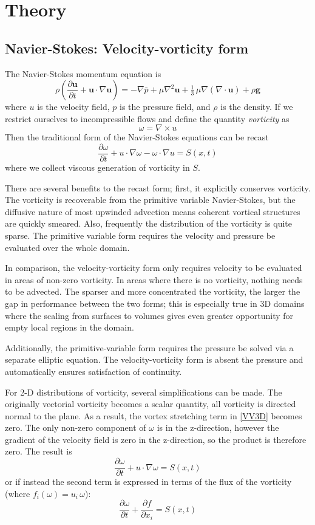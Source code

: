 \documentclass[letterpaper,12pt]{report}
\newcommand{\be}{\begin{equation}}
\newcommand{\ben}[1]{\begin{equation}\label{#1}}
\newcommand{\ee}{\end{equation}}
\begin{document}
\chapter{Theory}
\section{Navier-Stokes: Velocity-vorticity form}
The Navier-Stokes momentum equation is
 \be \rho \left(\frac{\partial \mathbf{u}}{\partial t} + \mathbf{u} \cdot \nabla \mathbf{u} \right) = -\nabla \bar{p} + \mu \nabla^2 \mathbf u + \tfrac13 \, \mu \nabla (\nabla\cdot\mathbf{u}) + \rho \mathbf{g}  \ee
where $u$ is the velocity field, $p$ is the pressure field, and $\rho$ is the density. If we restrict ourselves to incompressible flows and define the quantity \textit{vorticity} as
\be \omega = \nabla \times u \ee
Then the traditional form of the Navier-Stokes equations can be recast
\ben{VV3D} \frac{\partial \omega}{\partial t} + u \cdot \nabla \omega - \omega \cdot \nabla u = S(x,t)\ee
where we collect viscous generation of vorticity in $S$.

There are several benefits to the recast form; first, it explicitly conserves vorticity. The vorticity is recoverable from the primitive variable Navier-Stokes, but the diffusive nature of most upwinded advection means coherent vortical structures are quickly smeared. Also, frequently the distribution of the vorticity is quite sparse. The primitive variable form requires the velocity and pressure be evaluated over the whole domain.

In comparison, the velocity-vorticity form only requires velocity to be evaluated in areas of non-zero vorticity. In areas where there is no vorticity, nothing needs to be advected. The sparser and more concentrated the vorticity, the larger the gap in performance between the two forms; this is especially true in 3D domains where the scaling from surfaces to volumes gives even greater opportunity for empty local regions in the domain. 

Additionally, the primitive-variable form requires the pressure be  solved via a separate elliptic equation. The velocity-vorticity form is absent the pressure and automatically ensures satisfaction of continuity.

For 2-D distributions of vorticity, several simplifications can be made. The originally vectorial vorticity becomes a scalar quantity, all vorticity is directed normal to the plane. As a result, the vortex stretching term in \eqref{VV3D} becomes zero. The only non-zero component of $\omega$ is in the z-direction, however the gradient of the velocity field is zero in the z-direction, so the product is therefore zero. The result is
\ben{VV2D} \frac{\partial \omega}{\partial t} + u \cdot \nabla \omega = S(x,t)\ee
or if instead the second term is expressed in terms of the flux of the vorticity (where $f_i(\omega)=u_i\,\omega$):
\ben{VV2DB} \frac{\partial \omega}{\partial t} + \frac{\partial f}{\partial x_i}= S(x,t)\ee
\end{document}
